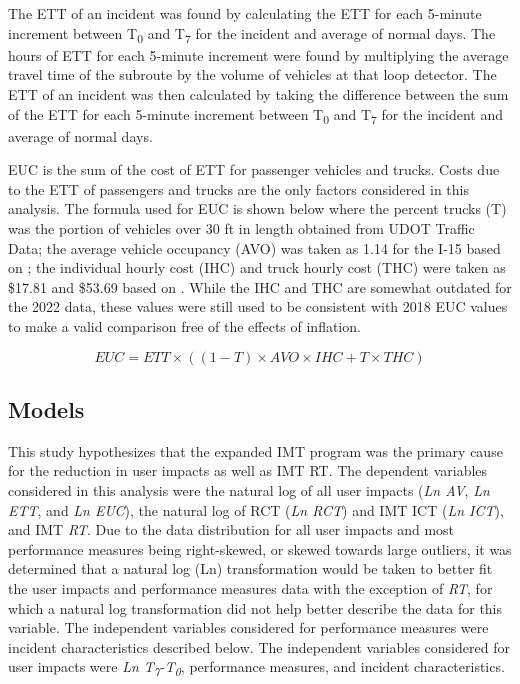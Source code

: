 \documentclass[
  letterpaper,
  authoryear]{elsarticle}
\begin{document}
The ETT of an incident was found by calculating the ETT for each
5-minute increment between T\textsubscript{0} and T\textsubscript{7} for
the incident and average of normal days. The hours of ETT for each
5-minute increment were found by multiplying the average travel time of
the subroute by the volume of vehicles at that loop detector. The ETT of
an incident was then calculated by taking the difference between the sum
of the ETT for each 5-minute increment between T\textsubscript{0} and
T\textsubscript{7} for the incident and average of normal days.

EUC is the sum of the cost of ETT for passenger vehicles and trucks.
Costs due to the ETT of passengers and trucks are the only factors
considered in this analysis. The formula used for EUC is shown below
where the percent trucks (T) was the portion of vehicles over 30 ft in
length obtained from UDOT Traffic Data; the average vehicle occupancy
(AVO) was taken as 1.14 for the I-15 based on
\citet{schultz_ut1503_2015}; the individual hourly cost (IHC) and truck
hourly cost (THC) were taken as \$17.81 and \$53.69 based on
\citet{ellis_value_2017}. While the IHC and THC are somewhat outdated
for the 2022 data, these values were still used to be consistent with
2018 EUC values to make a valid comparison free of the effects of
inflation.

\[EUC = ETT \times ((1-T) \times AVO \times IHC + T \times THC) \]

\subsection{Models}\label{models}

This study hypothesizes that the expanded IMT program was the primary
cause for the reduction in user impacts as well as IMT RT. The dependent
variables considered in this analysis were the natural log of all user
impacts (\emph{Ln AV}, \emph{Ln ETT}, and \emph{Ln EUC}), the natural
log of RCT (\emph{Ln RCT}) and IMT ICT (\emph{Ln ICT}), and IMT
\emph{RT}. Due to the data distribution for all user impacts and most
performance measures being right-skewed, or skewed towards large
outliers, it was determined that a natural log (Ln) transformation would
be taken to better fit the user impacts and performance measures data
with the exception of \emph{RT}, for which a natural log transformation
did not help better describe the data for this variable. The independent
variables considered for performance measures were incident
characteristics described below. The independent variables considered
for user impacts were \emph{Ln T\textsubscript{7}-T\textsubscript{0}},
performance measures, and incident characteristics.
\end{document}
